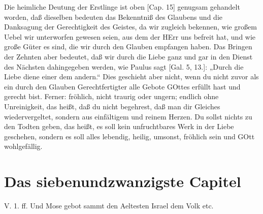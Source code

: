 Die heimliche Deutung der Erstlinge ist oben [Cap. 15] genugsam gehandelt worden, daß dieselben bedeuten das Bekenntniß des Glaubens und die Danksagung der Gerechtigkeit des Geistes, da wir zugleich bekennen, wie großem Uebel wir unterworfen gewesen seien, aus dem der HErr uns befreit hat, und wie große Güter es sind, die wir durch den Glauben empfangen haben. Das Bringen der Zehnten aber bedeutet, daß wir durch die Liebe ganz und gar in den Dienst des Nächsten dahingegeben werden, wie Paulus sagt [Gal. 5, 13.]: „Durch die Liebe diene einer dem andern.“ Dies geschieht aber nicht, wenn du nicht zuvor als ein durch den Glauben Gerechtfertigter alle Gebote GOttes erfüllt hast und gerecht bist. Ferner: fröhlich, nicht traurig oder ungern; endlich ohne Unreinigkeit, das heißt, daß du nicht begehrest, daß man dir Gleiches wiedervergeltet, sondern aus einfältigem und reinem Herzen. Du sollst nichts zu den Todten geben, das heißt, es soll kein unfruchtbares Werk in der Liebe geschehen, sondern es soll alles lebendig, heilig, umsonst, fröhlich sein und GOtt wohlgefällig.

\section{Das siebenundzwanzigste Capitel}

\begin{schriftzitat}
V. 1. ff. Und Mose gebot sammt den Aeltesten Israel dem Volk etc.
\end{schriftzitat}

